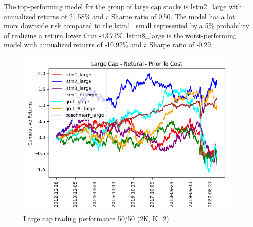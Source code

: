 \indent\newline 
\begin{table}[ht]
\centering
{}
\caption{50/50 long-short large cap (2K, K=2)}
\end{table}
\indent\newline 
The top-performing model for the group of large cap stocks is lstm2\_large with annualized returns of 21.58\% and a Sharpe ratio of 0.50. The model has a lot more downside risk compared to the lstm1\_small represented by a 5\% probability of realizing a return lower than -43.71\%. lstmi8\_large is the worst-performing model with annualized returns of -10.92\% and a Sharpe ratio of -0.29.    
\indent\newline 
\begin{figure}[H]
\centering
\includegraphics [scale=0.60,angle=360]{figures/cumulative_large_cap_return_no_cost_n.png}
\caption{Large cap trading performance 50/50 (2K, K=2)}
\label{fig:5050large}
\end{figure} 
